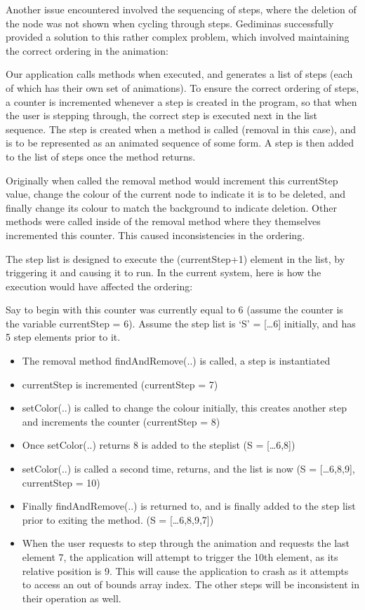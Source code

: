 \documentclass{l3proj}
\begin{document}
Another issue encountered involved the sequencing of steps, where the deletion of the node was not shown when cycling through steps. Gediminas successfully provided a solution to this rather complex problem, which involved maintaining the correct ordering in the animation:

Our application calls methods when executed, and generates a list of steps (each of which has their own set of animations). To ensure the correct ordering of steps, a counter is incremented whenever a step is created in the program, so that when the user is stepping through, the correct step is executed next in the list sequence. The step is created when a method is called (removal in this case), and is to be represented as an animated sequence of some form. A step is then added to the list of steps once the method returns.

Originally when called the removal method would increment this currentStep value, change the colour of the current node to indicate it is to be deleted, and finally change its colour to match the background to indicate deletion. Other methods were called inside of the removal method where they themselves incremented this counter. This caused inconsistencies in the ordering.

The step list is designed to execute the (currentStep+1) element in the list, by triggering it and causing it to run. 
In the current system, here is how the execution would have affected the ordering:

Say to begin with this counter was currently equal to 6 (assume the counter is the variable currentStep = 6). Assume the step list is ‘S’ = […6] initially, and has 5 step elements prior to it.
\begin{itemize}
\item The removal method findAndRemove(..) is called, a step is instantiated
\item currentStep is incremented (currentStep = 7)
\item setColor(..) is called to change the colour initially, this creates another step and increments the counter (currentStep = 8)
\item Once setColor(..) returns 8 is added to the steplist (S = […6,8]) 
\item setColor(..) is called a second time, returns, and the list is now (S = […6,8,9], currentStep = 10) 
\item Finally findAndRemove(..) is returned to, and is finally added to the step list prior to exiting the method. (S = […6,8,9,7])
\item When the user requests to step through the animation and requests the last element 7, the application will attempt to trigger the 10th element, as its relative position is 9. This will cause the application to crash as it attempts to access an out of bounds array index. The other steps will be inconsistent in their operation as well.
\end{itemize}
\end{document}
